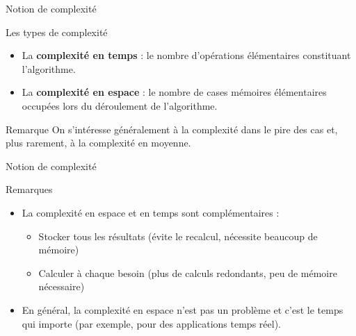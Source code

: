 \begin{frame}{Notion de complexité}
\begin{block}{Les types de complexité}
  \begin{itemize}
    \item La \textbf{complexité en temps} : le nombre d'opérations élémentaires constituant l'algorithme.
    \item La \textbf{complexité en espace} : le nombre de cases mémoires élémentaires occupées lors du déroulement de l'algorithme.
  \end{itemize}
\end{block}

\begin{exampleblock}{Remarque}
On s'intéresse généralement à la complexité dans le pire des cas et, plus rarement, à la complexité en moyenne.
\end{exampleblock}
\end{frame}

\begin{frame}{Notion de complexité}
\begin{exampleblock}{Remarques}
\begin{itemize}
\item La complexité en espace et en temps sont complémentaires :
  \begin{itemize}
  \item Stocker tous les résultats (évite le recalcul, nécessite beaucoup de mémoire)
  \item Calculer à chaque besoin (plus de calculs redondants, peu de mémoire nécessaire)
  \end{itemize}
\item En général, la complexité en espace n'est pas un problème et c'est le temps qui importe (par exemple, pour des applications temps réel).
\end{itemize}
\end{exampleblock}
\end{frame}



